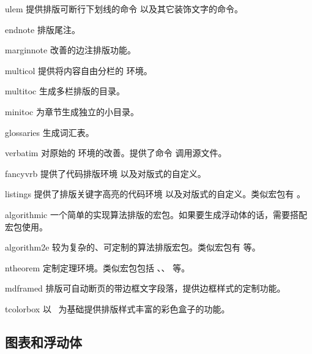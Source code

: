 \begin{pkglist}
  \item[ulem]     提供排版可断行下划线的命令  以及其它装饰文字的命令。
  \item[endnote]  排版尾注。
  \item[marginnote] 改善的边注排版功能。
  \item[multicol] 提供将内容自由分栏的  环境。
  \item[multitoc] 生成多栏排版的目录。
  \item[minitoc]  为章节生成独立的小目录。
  \item[glossaries] 生成词汇表。
  \item[verbatim] 对原始的  环境的改善。提供了命令  调用源文件。
  \item[fancyvrb] 提供了代码排版环境  以及对版式的自定义。
  \item[listings] 提供了排版关键字高亮的代码环境  以及对版式的自定义。类似宏包有 。
  \item[algorithmic] 一个简单的实现算法排版的宏包。如果要生成浮动体的话，需要搭配  宏包使用。
  \item[algorithm2e] 较为复杂的、可定制的算法排版宏包。类似宏包有  等。
  \item[ntheorem] 定制定理环境。类似宏包包括 、、 等。
  \item[mdframed] 排版可自动断页的带边框文字段落，提供边框样式的定制功能。
  \item[tcolorbox] 以 \TikZ\ 为基础提供排版样式丰富的彩色盒子的功能。
\end{pkglist}

\subsection{图表和浮动体}\label{subsec:pkg-tab-fig}

